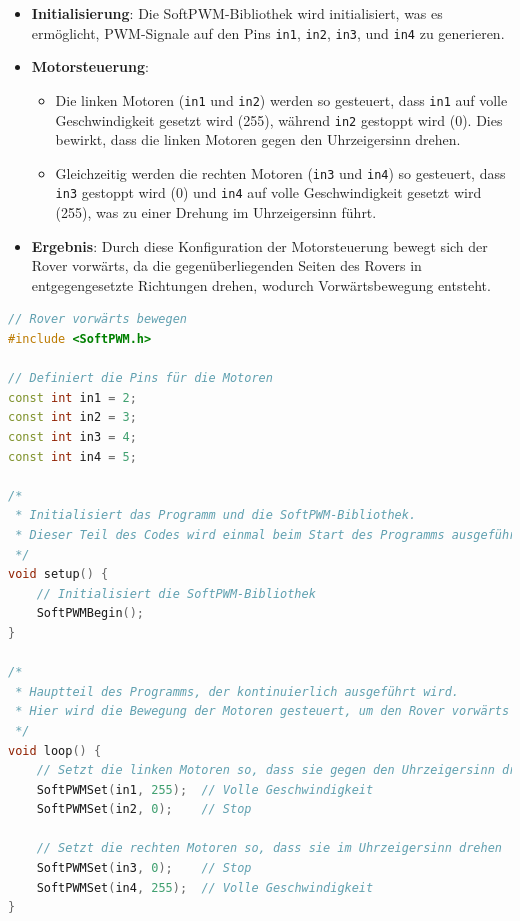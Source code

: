 \documentclass{vorlage-design-main}
\begin{document}
\begin{itemize}

\item
  \textbf{Initialisierung}: Die SoftPWM-Bibliothek wird initialisiert,
  was es ermöglicht, PWM-Signale auf den Pins
  \verb|in1|, \verb|in2|,
  \verb|in3|, und \verb|in4| zu
  generieren.
\item
  \textbf{Motorsteuerung}:

  \begin{itemize}
  
  \item
    Die linken Motoren (\verb|in1| und
    \verb|in2|) werden so gesteuert, dass
    \verb|in1| auf volle Geschwindigkeit gesetzt wird
    (255), während \verb|in2| gestoppt wird (0). Dies
    bewirkt, dass die linken Motoren gegen den Uhrzeigersinn drehen.
  \item
    Gleichzeitig werden die rechten Motoren
    (\verb|in3| und \verb|in4|) so
    gesteuert, dass \verb|in3| gestoppt wird (0) und
    \verb|in4| auf volle Geschwindigkeit gesetzt wird
    (255), was zu einer Drehung im Uhrzeigersinn führt.
  \end{itemize}
\item
  \textbf{Ergebnis}: Durch diese Konfiguration der Motorsteuerung bewegt
  sich der Rover vorwärts, da die gegenüberliegenden Seiten des Rovers
  in entgegengesetzte Richtungen drehen, wodurch Vorwärtsbewegung
  entsteht.
\end{itemize}

\begin{lstlisting}[language={C++}]
// Rover vorwärts bewegen
#include <SoftPWM.h>

// Definiert die Pins für die Motoren
const int in1 = 2;
const int in2 = 3;
const int in3 = 4;
const int in4 = 5;

/*
 * Initialisiert das Programm und die SoftPWM-Bibliothek.
 * Dieser Teil des Codes wird einmal beim Start des Programms ausgeführt.
 */
void setup() {
    // Initialisiert die SoftPWM-Bibliothek
    SoftPWMBegin();
}

/*
 * Hauptteil des Programms, der kontinuierlich ausgeführt wird.
 * Hier wird die Bewegung der Motoren gesteuert, um den Rover vorwärts zu bewegen.
 */
void loop() {
    // Setzt die linken Motoren so, dass sie gegen den Uhrzeigersinn drehen
    SoftPWMSet(in1, 255);  // Volle Geschwindigkeit
    SoftPWMSet(in2, 0);    // Stop

    // Setzt die rechten Motoren so, dass sie im Uhrzeigersinn drehen
    SoftPWMSet(in3, 0);    // Stop
    SoftPWMSet(in4, 255);  // Volle Geschwindigkeit
}
\end{lstlisting}
\end{document}
